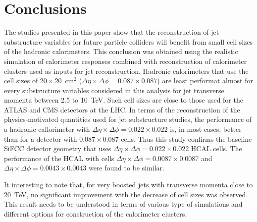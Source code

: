 \section{Conclusions}
The studies presented in this paper show that the reconstruction of jet substructure 
variables for future particle colliders will benefit from small cell sizes of the hadronic calorimeters. 
This conclusion was obtained using the realistic \GEANTfour simulation of calorimeter responses combined with reconstruction of 
calorimeter clusters used as inputs for jet reconstruction. 
Hadronic calorimeters that use the cell sizes of $20\times 20$~cm$^2$ ($\Delta \eta \times \Delta \phi = 0.087\times 0.087$) 
are least performat almost for every 
substructure variables considered in this analysis for jet transverse momenta between 2.5 to 10~TeV. 
Such cell sizes are close to 
those used for the ATLAS and CMS detectors at the LHC. 
In terms of the reconstruction of the physics-motivated quantities  
used for jet substructure studies, the  performance 
of a  hadronic callorimeter  with 
$\Delta \eta \times \Delta \phi = 0.022\times0.022$ is, in most cases,
better than for a detector with  $0.087\times 0.087$ cells.
Thus this study confirms the  baseline SiFCC detector geometry \cite{Chekanov:2016ppq}
that uses $\Delta \eta \times \Delta \phi = 0.022\times0.022$ HCAL cells.
The performance of the HCAL with cells $\Delta \eta \times \Delta \phi = 0.0087\times 0.0087$ and 
$\Delta \eta \times \Delta \phi = 0.0043\times 0.0043$ were found to be similar.

It interesting to note that,  for very boosted jets with transverse momenta close to 20~TeV, no significant improvement with the 
decrease of cell sizes was observed. This result needs to be understood in terms of various type of simulations and 
different options for construction of the calorimeter clusters.


